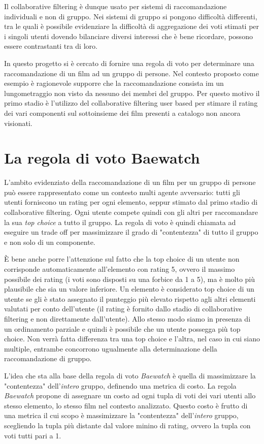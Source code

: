 \documentclass[letterpaper]{article}
\begin{document}
Il collaborative filtering è dunque usato per sistemi di raccomandazione individuali e non di gruppo. Nei sistemi di gruppo si pongono difficoltà differenti, tra le quali è possibile evidenziare la difficoltà di aggregazione dei voti stimati per i singoli utenti dovendo bilanciare diversi interessi che è bene ricordare, possono essere contrastanti tra di loro. 

In questo progetto si è cercato di fornire una regola di voto per determinare una raccomandazione di un film ad un gruppo di persone. Nel contesto proposto come esempio è ragionevole supporre che la raccomandazione consista im un lungometraggio non visto da nessuno dei membri del gruppo. Per questo motivo il primo stadio è l'utilizzo del collaborative filtering user based per stimare il rating dei vari componenti sul sottoinsieme dei film presenti a catalogo non ancora visionati.

\section{La regola di voto Baewatch}
L'ambito evidenziato della raccomandazione di un film per un gruppo di persone può essere rappresentato come un contesto multi agente avversario: tutti gli utenti forniscono un rating per ogni elemento, seppur stimato dal primo stadio di collaborative filtering. Ogni utente compete quindi con gli altri per raccomandare la sua \emph{top choice} a tutto il gruppo. La regola di voto è quindi chiamata ad eseguire un trade off per massimizzare il grado di "contentezza" di tutto il gruppo e non solo di un componente.

\`E bene anche porre l'attenzione sul fatto che la top choice di un utente non corrisponde automaticamente all'elemento con rating 5, ovvero il massimo possibile dei rating (i voti sono disposti su una forbice da 1 a 5), ma è molto più plausibile che sia un valore inferiore. Un elemento è considerato top choice di un utente se gli è stato assegnato il punteggio più elevato rispetto agli altri elementi valutati per conto dell'utente (il rating è fornito dallo stadio di collaborative filtering e non direttamente dall'utente). Allo stesso modo siamo in presenza di un ordinamento parziale e quindi è possibile che un utente possegga più top choice. Non verrà fatta differenza tra una top choice e l'altra, nel caso in cui siano multiple, entrambe concorrono ugualmente alla determinazione della raccomandazione di gruppo.

L'idea che sta alla base della regola di voto \emph{Baewatch} è quella di massimizzare la "contentezza" dell'\emph{intero} gruppo, definendo una metrica di costo. La regola \emph{Baewatch} propone di assegnare un costo ad ogni tupla di voti dei vari utenti allo stesso elemento, lo stesso film nel contesto analizzato. Questo costo è frutto di una metrica il cui scopo è massimizzare la "contentezza" dell'\emph{intero} gruppo, scegliendo la tupla più distante dal valore minino di rating, ovvero la tupla con voti tutti pari a 1.
\end{document}
